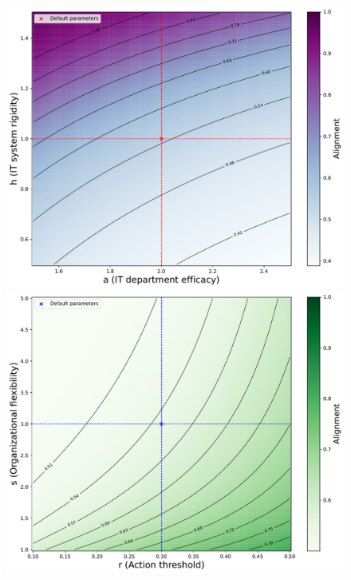 \documentclass[a4paper, 10pt]{article}
\begin{document}
\begin{figure}[h]
    \centering
    \begin{minipage}[b]{0.48\textwidth}
        \includegraphics[width=\textwidth]{../images/int-cases/sim-1.pdf}
    \end{minipage}
    \hfill
    \begin{minipage}[b]{0.48\textwidth}
        \includegraphics[width=\textwidth]{../images/int-cases/sim-2.pdf}
    \end{minipage}
    \par\vspace{1em}

\end{figure}
\end{document}

